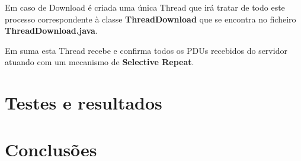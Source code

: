 \documentclass{llncs}
\begin{document}
Em caso de Download é criada uma única Thread que irá tratar de todo este processo correspondente à classe \textbf{ThreadDownload} que se encontra no ficheiro \textbf{ThreadDownload.java}.

Em suma esta Thread recebe e confirma todos os PDUs recebidos do servidor atuando com um mecanismo de \textbf{Selective Repeat}.





\section{Testes e resultados}



\section{Conclusões}
\end{document}
